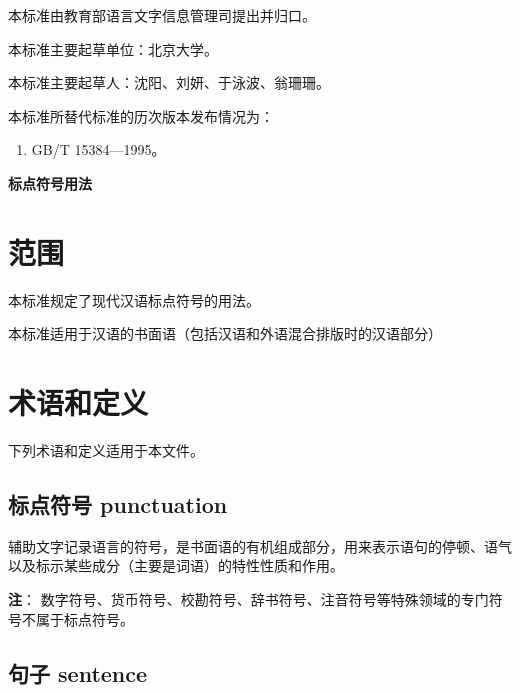 \documentclass[a4paper]{article}
\begin{document}
{本标准由教育部语言文字信息管理司提出并归口。}

{本标准主要起草单位：北京大学。}

{本标准主要起草人：沈阳、刘妍、于泳波、翁珊珊。}

{本标准所替代标准的历次版本发布情况为：}

\begin{enumerate}[label=——,labelsep=0pt,left=0em, align=left,topsep=1pt,parsep=1pt]
    \item GB/T 15384—1995。
\end{enumerate}


\newpage


\begin{center}
    \Large{\textbf{标\hspace{0.5em}点\hspace{0.5em}符\hspace{0.5em}号\hspace{0.5em}用\hspace{0.5em}法}}
\end{center}
\vspace{0.5cm}

\section{范围}

本标准规定了现代汉语标点符号的用法。

本标准适用于汉语的书面语（包括汉语和外语混合排版时的汉语部分）

\section{术语和定义}

下列术语和定义适用于本文件。

\subsection{标点符号 punctuation}

辅助文字记录语言的符号，是书面语的有机组成部分，用来表示语句的停顿、语气以及标示某些成分（主要是词语）的特性性质和作用。

\textbf{注}：
数字符号、货币符号、校勘符号、辞书符号、注音符号等特殊领域的专门符号不属于标点符号。

\subsection{句子 sentence}
\end{document}
